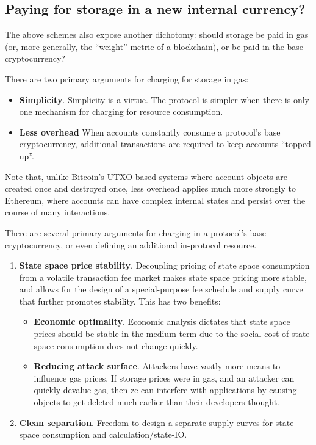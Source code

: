 \documentclass[12pt, final]{article}
\begin{document}

\subsection{Paying for storage in a new internal currency?}

The above schemes also expose another dichotomy: should storage be paid in gas (or, more generally, the ``weight'' metric of a blockchain), or be paid in the base cryptocurrency?

There are two primary arguments for charging for storage in gas:
\begin{itemize}
\item \textbf{Simplicity}. Simplicity is a virtue. The protocol is simpler when there is only one mechanism for charging for resource consumption.
\item \textbf{Less overhead} When accounts constantly consume a protocol's base cryptocurrency, additional transactions are required to keep accounts ``topped up''.
\end{itemize}

Note that, unlike Bitcoin's UTXO-based systems where account objects are created once and destroyed once, less overhead applies much more strongly to Ethereum, where accounts can have complex internal states and persist over the course of many interactions.

There are several primary arguments for charging in a protocol's base cryptocurrency, or even defining an additional in-protocol resource.

\begin{enumerate}
\item \textbf{State space price stability}.  Decoupling pricing of state space consumption from a volatile transaction fee market makes state space pricing more stable, and allows for the design of a special-purpose fee schedule and supply curve that further promotes stability. This has two benefits:

\begin{itemize}
\item \textbf{Economic optimality}. Economic analysis dictates that state space prices should be stable in the medium term due to the social cost of state space consumption does not change quickly.

\item \textbf{Reducing attack surface}. Attackers have vastly more means to influence gas prices.  If storage prices were in gas, and an attacker can quickly devalue gas, then ze can interfere with applications by causing objects to get deleted much earlier than their developers thought.
\end{itemize}

\item \textbf{Clean separation}. Freedom to design a separate supply curves for state space consumption and calculation/state-IO.

\end{enumerate}
\end{document}
